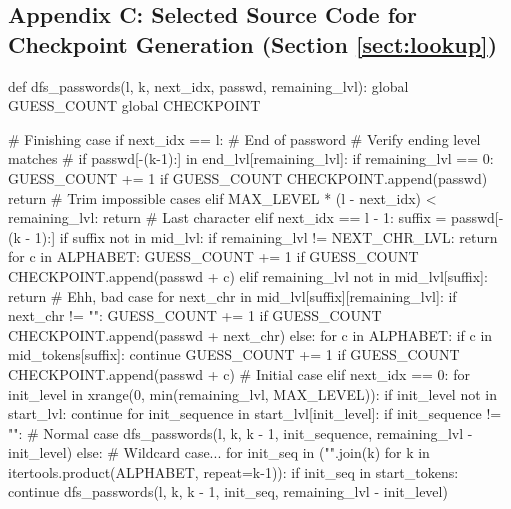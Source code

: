 \documentclass{article} %
\theoremstyle{definition}
\theoremstyle{theorem}
\theoremstyle{remark}
\theoremstyle{remark}
\begin{document}
\subsection*{Appendix C: Selected Source Code for Checkpoint Generation (Section \ref{sect:lookup})}

\begin{python}
def dfs_passwords(l, k, next_idx, passwd, remaining_lvl):
    global GUESS_COUNT
    global CHECKPOINT

    # Finishing case
    if next_idx == l:   # End of password
        # Verify ending level matches
        # if passwd[-(k-1):] in end_lvl[remaining_lvl]:
        if remaining_lvl == 0:
            GUESS_COUNT += 1
            if GUESS_COUNT %
                CHECKPOINT.append(passwd)
        return
    # Trim impossible cases
    elif MAX_LEVEL * (l - next_idx) < remaining_lvl:
        return
    # Last character
    elif next_idx == l - 1:
        suffix = passwd[-(k - 1):]
        if suffix not in mid_lvl:
            if remaining_lvl != NEXT_CHR_LVL:
                return
            for c in ALPHABET:
                GUESS_COUNT += 1
                if GUESS_COUNT %
                    CHECKPOINT.append(passwd + c)
        elif remaining_lvl not in mid_lvl[suffix]:
            return  # Ehh, bad case
        for next_chr in mid_lvl[suffix][remaining_lvl]:
            if next_chr != "":
                GUESS_COUNT += 1
                if GUESS_COUNT %
                    CHECKPOINT.append(passwd + next_chr)
            else:
                for c in ALPHABET:
                    if c in mid_tokens[suffix]:
                        continue
                    GUESS_COUNT += 1
                    if GUESS_COUNT %
                        CHECKPOINT.append(passwd + c)
    # Initial case
    elif next_idx == 0:
        for init_level in xrange(0, min(remaining_lvl, MAX_LEVEL)):
            if init_level not in start_lvl:
                continue
            for init_sequence in start_lvl[init_level]:
                if init_sequence != "":
                    # Normal case
                    dfs_passwords(l, k, k - 1, init_sequence, remaining_lvl - init_level)
                else:
                    # Wildcard case...
                    for init_seq in ("".join(k) for k in itertools.product(ALPHABET, repeat=k-1)):
                        if init_seq in start_tokens:
                            continue
                        dfs_passwords(l, k, k - 1, init_seq, remaining_lvl - init_level)

\end{python}
\end{document}
